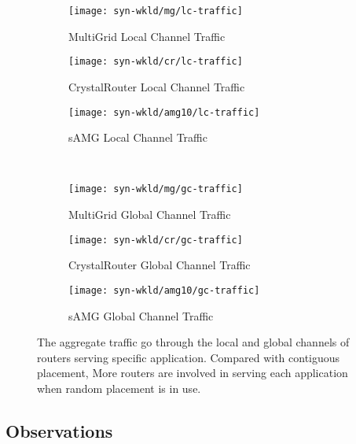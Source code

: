 \begin{figure*}[t]
    \centering
    \begin{subfigure}[t]{0.32\textwidth}
        \centering
        \texttt{[image: syn-wkld/mg/lc-traffic]}
        \caption{MultiGrid Local Channel Traffic}
        \label{fig:syn-mg-lc-traffic}
    \end{subfigure}\hfill
    \begin{subfigure}[t]{0.32\textwidth}
        \centering
        \texttt{[image: syn-wkld/cr/lc-traffic]}
        \caption{CrystalRouter Local Channel Traffic}
        \label{fig:syn-cr-lc-traffic}
    \end{subfigure}\hfill
    \begin{subfigure}[t]{0.32\textwidth}
        \centering
        \texttt{[image: syn-wkld/amg10/lc-traffic]}
        \caption{sAMG Local Channel Traffic}
        \label{fig:syn-samg-lc-traffic}
    \end{subfigure}\\
    \centering
    \begin{subfigure}[t]{0.32\textwidth}
        \centering
        \texttt{[image: syn-wkld/mg/gc-traffic]}
        \caption{MultiGrid Global Channel Traffic}
        \label{fig:syn-mg-gc-traffic}
    \end{subfigure}\hfill
    \begin{subfigure}[t]{0.32\textwidth}
        \centering
        \texttt{[image: syn-wkld/cr/gc-traffic]}
        \caption{CrystalRouter Global Channel Traffic}
        \label{fig:syn-cr-gc-traffic}
    \end{subfigure}\hfill
    \begin{subfigure}[t]{0.32\textwidth}
        \centering
        \texttt{[image: syn-wkld/amg10/gc-traffic]}
        \caption{sAMG Global Channel Traffic}
        \label{fig:syn-samg-gc-traffic}
    \end{subfigure}
   \caption{The aggregate traffic go through the local and global channels of routers serving specific application. Compared with contiguous placement, More routers are involved in serving each application when random placement is in use.}
   \label{fig:syn-3app-gc-traffic}
\end{figure*}



\subsection{Observations}


